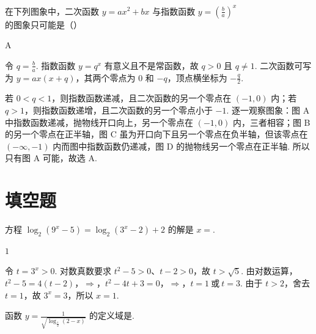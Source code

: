\begin{problem}
在下列图象中，二次函数 \(y=ax^2+bx\) 与指数函数 \(y=\left(\frac{b}{a}\right)^x\) 的图象只可能是（\quad）

    {}
    {}
    {}
\end{problem}

\begin{answer}
A
\end{answer}

\begin{solution}
令 \(q=\frac{b}{a}\). 指数函数 \(y=q^x\) 有意义且不是常函数，故 \(q>0\) 且 \(q\neq1\). 二次函数可写为 \(y=ax(x+q)\)，其两个零点为 \(0\) 和 \(-q\)，顶点横坐标为 \(-\frac{q}{2}\).

若 \(0<q<1\)，则指数函数递减，且二次函数的另一个零点在 \((-1,0)\) 内；若 \(q>1\)，则指数函数递增，且二次函数的另一个零点小于 \(-1\). 逐一观察图象：图 A 中指数函数递减，抛物线开口向上，另一个零点在 \((-1,0)\) 内，三者相容；图 B 的另一个零点在正半轴，图 C 虽为开口向下且另一个零点在负半轴，但该零点在 \((-\infty,-1)\) 内而图中指数函数仍递减，图 D 的抛物线另一个零点在正半轴. 所以只有图 A 可能，故选 A.
\end{solution}

\section{填空题}

\begin{problem}
方程 \(\log_{2}\left(9^x-5\right)=\log_{2}\left(3^x-2\right)+2\) 的解是 \(x=\)\fillinblank{}.
\end{problem}

\begin{answer}
\(1\)
\end{answer}

\begin{solution}
令 \(t=3^x>0\). 对数真数要求 \(t^2-5>0\)、\(t-2>0\)，故 \(t>\sqrt{5}\). 由对数运算，
\(t^2-5=4(t-2)\)，\(\Longrightarrow\)，\(t^2-4t+3=0\)，\(\Longrightarrow\)，\(t=1\ \text{或}\ t=3\).
由于 \(t>2\)，舍去 \(t=1\)，故 \(3^x=3\)，所以 \(x=1\).
\end{solution}

\begin{problem}
函数 \(y=\frac{1}{\sqrt{\log_{\frac{1}{2}}(2-x)}}\) 的定义域是\fillinblank{}.
\end{problem}

